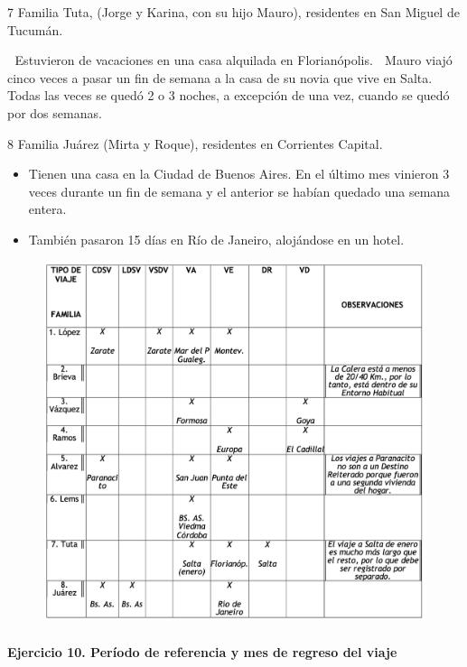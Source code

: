 \documentclass[
  openany]{book}
\begin{document}
7 Familia Tuta, (Jorge y Karina, con su hijo Mauro), residentes en San Miguel de Tucumán.

 Estuvieron de vacaciones en una casa alquilada en Florianópolis.  Mauro viajó cinco veces a pasar un fin de semana a la casa de su novia que vive en Salta. Todas las veces se quedó 2 o 3 noches, a excepción de una vez, cuando se quedó por dos semanas.

8 Familia Juárez (Mirta y Roque), residentes en Corrientes Capital.

\begin{itemize}
\item
  Tienen una casa en la Ciudad de Buenos Aires. En el último mes vinieron 3 veces durante un fin de semana y el anterior se habían quedado una semana entera.
\item
  También pasaron 15 días en Río de Janeiro, alojándose en un hotel.
\end{itemize}

\begin{figure}

{\centering \includegraphics[width=1\linewidth]{imagenes/figura6-150} 

}

\end{figure}

\hypertarget{ejercicio-10.-peruxedodo-de-referencia-y-mes-de-regreso-del-viaje-1}{%
\paragraph{Ejercicio 10. Período de referencia y mes de regreso del viaje}\label{ejercicio-10.-peruxedodo-de-referencia-y-mes-de-regreso-del-viaje-1}}
\end{document}
